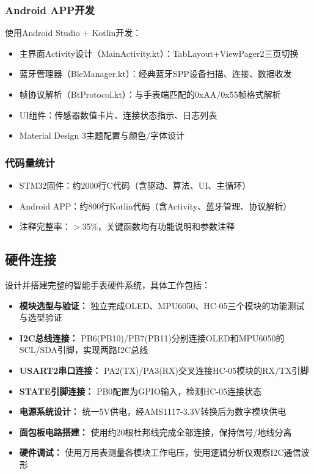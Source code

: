 \subsubsection{Android APP开发}
使用Android Studio + Kotlin开发：
\begin{itemize}
    \item 主界面Activity设计（MainActivity.kt）：TabLayout+ViewPager2三页切换
    \item 蓝牙管理器（BleManager.kt）：经典蓝牙SPP设备扫描、连接、数据收发
    \item 帧协议解析（BtProtocol.kt）：与手表端匹配的0xAA/0x55帧格式解析
    \item UI组件：传感器数值卡片、连接状态指示、日志列表
    \item Material Design 3主题配置与颜色/字体设计
\end{itemize}

\subsubsection{代码量统计}
\begin{itemize}
    \item STM32固件：约2000行C代码（含驱动、算法、UI、主循环）
    \item Android APP：约800行Kotlin代码（含Activity、蓝牙管理、协议解析）
    \item 注释完整率：$>$35\%，关键函数均有功能说明和参数注释
\end{itemize}

\subsection{硬件连接}
设计并搭建完整的智能手表硬件系统，具体工作包括：
\begin{itemize}
    \item \textbf{模块选型与验证：} 独立完成OLED、MPU6050、HC-05三个模块的功能测试与选型验证
    \item \textbf{I2C总线连接：} PB6(PB10)/PB7(PB11)分别连接OLED和MPU6050的SCL/SDA引脚，实现两路I2C总线
    \item \textbf{USART2串口连接：} PA2(TX)/PA3(RX)交叉连接HC-05模块的RX/TX引脚
    \item \textbf{STATE引脚连接：} PB0配置为GPIO输入，检测HC-05连接状态
    \item \textbf{电源系统设计：} 统一5V供电，经AMS1117-3.3V转换后为数字模块供电
    \item \textbf{面包板电路搭建：} 使用约20根杜邦线完成全部连接，保持信号/地线分离
    \item \textbf{硬件调试：} 使用万用表测量各模块工作电压，使用逻辑分析仪观察I2C通信波形
\end{itemize}

